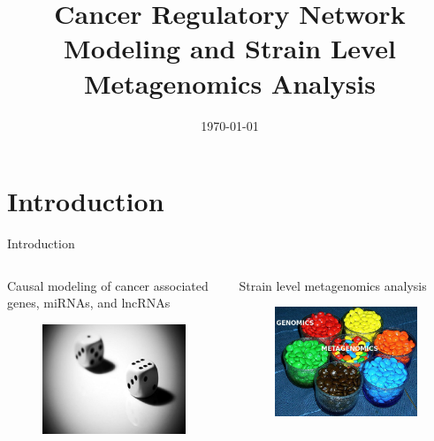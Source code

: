\documentclass{beamer}
\title[Network and Metagenomics]{Cancer Regulatory Network Modeling and Strain Level Metagenomics Analysis}
\author[Dogan]
{%
	\texorpdfstring{
		\begin{columns}
			\column{.45\linewidth}
			\centering
			Haluk Dogan\\
			\url{https://haluk.github.io/}\\
			\href{mailto:hdogan@vivaldi.net}{hdogan@vivaldi.net}
		\end{columns}
	}
	{Dogan}
}
\institute[UNL@CSE@SBBI] %
{
	Department of Computer Science\\
	University of Nebraska-Lincoln
}
\date[\today] %
{\today}
\begin{document}
\begin{frame}
	\titlepage
\end{frame}

\section{Introduction}
\begin{frame}{Introduction}
	\begin{columns}
		\begin{column}[b]{.48\textwidth}
			Causal modeling of cancer associated genes, miRNAs, and lncRNAs
			\begin{figure}[ht]
				\centering
				\includegraphics[width=1\textwidth]{img/prob.jpeg}
				\caption*{\label{fig:prob} }
			\end{figure}
		\end{column}
		\begin{column}[b]{.48\textwidth}
			Strain level metagenomics analysis
			\begin{figure}[ht]
				\centering
				\includegraphics[width=1\textwidth]{img/metagenome.jpg}
				\caption*{\label{fig:metagenome} }
			\end{figure}
		\end{column}
	\end{columns}
\end{frame}
\end{document}
